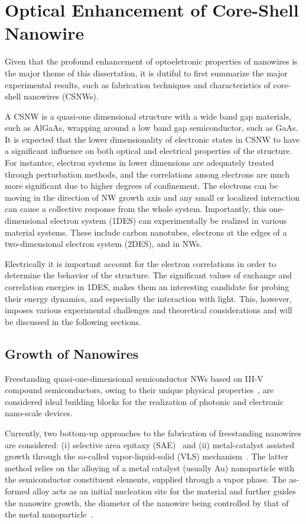 \chapter{Optical Enhancement of Core-Shell Nanowire} \label{data}

Given that the profound enhancement of optoeletronic properties of nanowires is
the major theme of this dissertation, it is dutiful to first summarize the
major experimental results, such as fabrication techniques and characteristics of
core-shell nanowires (CSNWs).

A CSNW is a quasi-one dimensional structure with a wide band gap materials,
such as AlGaAs, wrapping around a low band gap semiconductor, such as GaAs. It
is expected that the lower dimensionality of electronic states in CSNW to have
a significant influence on both optical and electrical properties of the
structure. For instantce, electron systems in lower dimensions are adequately
treated through perturbation methods, and the correlations among electrons are
much more significant due to higher degrees of confinement. The electrons can
be moving in the direction of NW growth axis and any small or localized
interaction can cause a collective response from the whole system. Importantly,
this one-dimensional electron system (1DES) can experimentally be realized in
various material systems. These include carbon nanotubes, electrons at the
edges of a two-dimensional electron system (2DES), and in NWs.

Electrically it is important account for the electron correlations in order to
determine the behavior of the structure. The significant values of exchange and
correlation energies in 1DES, makes them an interesting candidate for probing
their energy dynamics, and especially the interaction with light. This,
however, imposes various experimental challenges and theoretical considerations
and will be discussed in the following sections.

\section{Growth of Nanowires}

Freestanding quasi-one-dimensional semiconductor NWs based on III-V compound
semiconductors, owing to their unique physical
properties~\cite{huang2002gallium,Law:2004gl}, are considered ideal building
blocks for the realization of photonic and electronic nano-scale devices.

Currently, two bottom-up approaches to the fabrication of freestanding
nanowires are considered: (i) selective area epitaxy
(SAE)~\cite{motohisa2004catalyst} and (ii) metal-catalyst assisted growth
through the so-called vapor-liquid-solid (VLS) mechanism~\cite{wagner1964vapor,
givargizov1975fundamental}. The latter method relies on the alloying of a metal
catalyst (usually Au) nanoparticle with the semiconductor constituent elements,
supplied through a vapor phase. The as-formed alloy acts as an initial
nucleation site for the material and further guides the nanowire growth, the
diameter of the nanowire being controlled by that of the metal
nanoparticle~\cite{cui2001diameter}.

